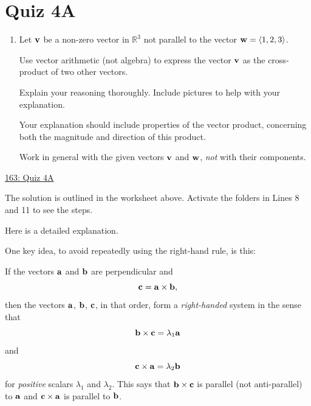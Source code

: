 \documentclass{ximera}
\begin{document}
\section{Quiz 4A}
\begin{question} \label{Qldfer33r}
\begin{enumerate}

\item Let ${\bf v}$ be a non-zero vector in $\mathbb{R}^3$ not parallel to the vector ${\bf w} = \langle 1,2,3\rangle$.

Use vector arithmetic (not algebra) to express the vector ${\bf v}$ as the cross-product of two other vectors.

Explain your reasoning thoroughly. Include pictures to help with your explanation.

Your explanation should include properties of the vector product, concerning both the magnitude and direction of this product.

Work in general with the given vectors ${\bf v}$ and ${\bf w}$, \emph{not} with their components.
\end{enumerate}


\begin{explanation}

\begin{onlineOnly}
    \begin{center}
\end{center}
\end{onlineOnly}

\href{https://www.desmos.com/3d/drkauraaje}{163: Quiz 4A}

The solution is outlined in the worksheet above. Activate the folders in Lines 8 and 11 to see the steps. 

Here is a detailed explanation.

One key idea, to avoid repeatedly using the right-hand rule, is this:

If the vectors ${\bf a}$ and ${\bf b}$ are perpendicular and 
\[
    {\bf c} = {\bf a}\times {\bf b},
\]
then the vectors ${\bf a}$, ${\bf b}$, ${\bf c}$, in that order, form a \emph{right-handed} system in the sense that 
\[
      {\bf b} \times {\bf c} = \lambda_1 {\bf a}
\]
and
\[
       {\bf c} \times {\bf a} = \lambda_2 {\bf b}
\]
for \emph{positive} scalars $\lambda_1$ and $\lambda_2$. This says that ${\bf b} \times {\bf c}$ is parallel (not anti-parallel) to ${\bf a}$ and ${\bf c} \times {\bf a}$ is parallel to ${\bf b}$.


\end{explanation}
\end{question}
\end{document}

